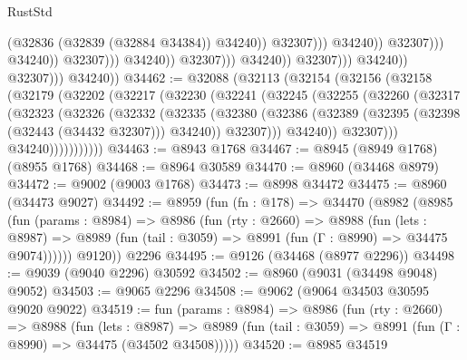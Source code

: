 \begin{lexlean}{RustStd}
\begin{coremodule}
                                                                  (@32836
                                                                    (@32839 (@32884 @34384))
                                                                    @34240))
                                                                @32307)))
                                                          @34240))
                                                      @32307)))
                                                @34240))
                                            @32307)))
                                      @34240))
                                  @32307)))
                            @34240))
                        @32307)))
                  @34240))
              @32307)))
        @34240))
@34462 := @32088
    (@32113
      (@32154
        (@32156
          (@32158
            (@32179
              (@32202
                (@32217
                  (@32230
                    (@32241
                      (@32245
                        (@32255
                          (@32260
                            (@32317
                              (@32323
                                (@32326
                                  (@32332
                                    (@32335
                                      (@32380
                                        (@32386
                                          (@32389 (@32395 (@32398 (@32443 (@34432 @32307))) @34240))
                                          @32307)))
                                    @34240))
                                @32307)))
                          @34240)))))))))))
@34463 := @8943 @1768
@34467 := @8945 (@8949 @1768) (@8955 @1768)
@34468 := @8964 @30589
@34470 := @8960 (@34468 @8979)
@34472 := @9002 (@9003 @1768)
@34473 := @8998 @34472
@34475 := @8960 (@34473 @9027)
@34492 := @8959
    (fun (fn : @178) =>
    @34470
      (@8982
        (@8985
          (fun (params : @8984) =>
          @8986
            (fun (rty : @2660) =>
            @8988
              (fun (lets : @8987) =>
              @8989 (fun (tail : @3059) => @8991 (fun (Γ : @8990) => @34475 @9074))))))
        @9120))
    @2296
@34495 := @9126 (@34468 (@8977 @2296))
@34498 := @9039 (@9040 @2296) @30592
@34502 := @8960 (@9031 (@34498 @9048) @9052)
@34503 := @9065 @2296
@34508 := @9062 (@9064 @34503 @30595 @9020 @9022)
@34519 := fun (params : @8984) =>
  @8986
    (fun (rty : @2660) =>
    @8988
      (fun (lets : @8987) =>
      @8989 (fun (tail : @3059) => @8991 (fun (Γ : @8990) => @34475 (@34502 @34508)))))
@34520 := @8985 @34519

\end{coremodule}
\end{lexlean}
